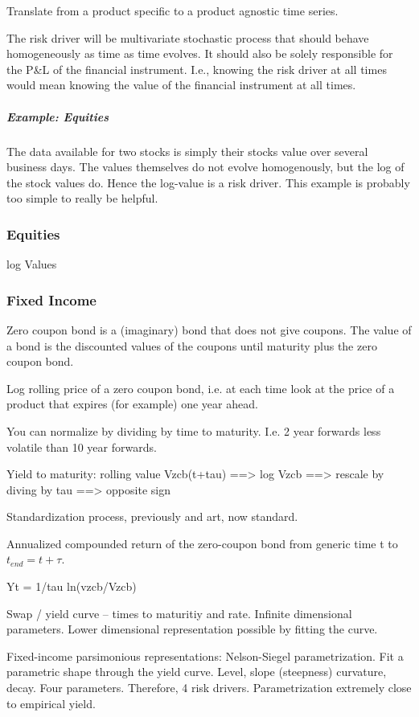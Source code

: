 Translate from a product specific to a product agnostic time series. 

The risk driver will be multivariate stochastic process that should behave homogeneously as time as time evolves. It should also be solely responsible for the P\&L of the financial instrument. I.e., knowing the risk driver at all times would mean knowing the value of the financial instrument at all times.

\subparagraph{Example: Equities} The data available for two stocks is simply their stocks value over several business days. The values themselves do not evolve homogenously, but the log of the stock values do. Hence the log-value is a risk driver. This example is probably too simple to really be helpful.

\subsubsection{Equities}
log Values

\subsubsection{Fixed Income}
Zero coupon bond is a (imaginary) bond that does not give coupons. The value of a bond is the discounted values of the coupons until maturity plus the zero coupon bond.
	

Log rolling price of a zero coupon bond, i.e. at each time look at the price of a product that expires (for example) one year ahead. 

You can normalize by dividing by time to maturity. I.e. 2 year forwards less volatile than 10 year forwards.

Yield to maturity: rolling value Vzcb(t+tau) ==> log Vzcb ==> rescale by diving by tau ==> opposite sign 

Standardization process, previously and art, now standard.

Annualized compounded return of the zero-coupon bond from generic time t to $t_{end} = t+\tau$. 

Yt = 1/tau ln(vzcb/Vzcb)

Swap / yield curve -- times to maturitiy and rate. Infinite dimensional parameters. Lower dimensional representation possible by fitting the curve.

Fixed-income parsimonious representations: Nelson-Siegel parametrization. Fit a parametric shape through the yield curve. Level, slope (steepness) curvature, decay. Four parameters. Therefore, 4 risk drivers. Parametrization extremely close to empirical yield.

